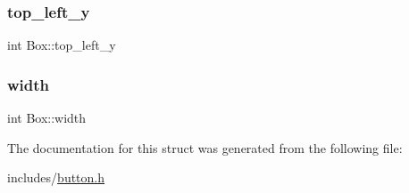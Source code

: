 \subsubsection{\texorpdfstring{top\+\_\+left\+\_\+y}{top\_left\_y}}
{\footnotesize\ttfamily int Box\+::top\+\_\+left\+\_\+y}

\mbox{\label{structBox_a46c951fd4f07b46a726c8fc38013b0f0}} 
\subsubsection{\texorpdfstring{width}{width}}
{\footnotesize\ttfamily int Box\+::width}



The documentation for this struct was generated from the following file\+:\begin{DoxyCompactItemize}
\item 
includes/\hyperlink{button_8h}{button.\+h}\end{DoxyCompactItemize}
